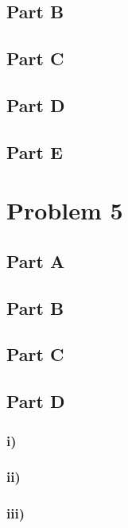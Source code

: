 \documentclass[12pt]{article}
\begin{document}
\subsection*{Part B}

\subsection*{Part C}

\subsection*{Part D}

\subsection*{Part E}


\section*{Problem 5}

\subsection*{Part A}

\subsection*{Part B}

\subsection*{Part C}

\subsection*{Part D}

\subsubsection*{i)}

\subsubsection*{ii)}

\subsubsection*{iii)}
\end{document}
